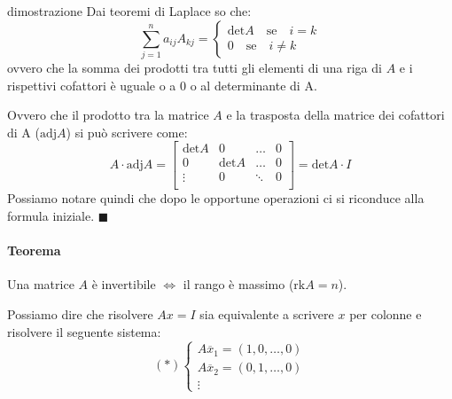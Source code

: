 \documentclass[x11names]{article}
\newcommand*{\QEDA}{\null\nobreak\hfill\ensuremath{\blacksquare}}%
\begin{document}
\begin{es}{dimostrazione}
Dai teoremi di Laplace so che:
\[
	\sum_{j=1}^n a_{ij}A_{kj} = \left\{\begin{array}{c} \text{det}A \quad \text{se} \quad i = k \\ 0 \quad \text{se}\quad i \neq k \end{array} \right
.\] 
ovvero che la somma dei prodotti tra tutti gli elementi di una riga di $A$ e i rispettivi cofattori è uguale o a $0$ o al determinante di A.

Ovvero che il prodotto tra la matrice $A$ e la trasposta della matrice dei cofattori di A ($\text{adj}A$) si può scrivere come:
\[
A \cdot \text{adj}A = \begin{bmatrix}
	\text{det}A & 0 & \dots & 0 \\
	0 & \text{det}A & \dots & 0\\
	\vdots & 0 &  \ddots & 0 \\

\end{bmatrix}
= \text{det}A \cdot I
\]
Possiamo notare quindi che dopo le opportune operazioni ci si riconduce alla formula iniziale.
\QEDA
\end{es}


\begin{center}
\colorbox{Bisque1}{\begin{minipage}{5.75in}

\paragraph{Teorema}
Una matrice $A$ è invertibile  $\Longleftrightarrow$ il rango è massimo ($\text{rk}A = n$).

Possiamo dire che risolvere $Ax = I$ sia equivalente a scrivere  $x$ per colonne e risolvere il seguente sistema:
\[
	\left(*\right) \left\{ \begin{array}{c} A\overline{x}_{1} = \left(1,0,\dots,0\right) \\ A\overline{x}_{2} = \left(0,1,\dots,0\right) \\ \vdots\end{array}\right
.\] 
\end{minipage}}        
\end{center}
\end{document}
